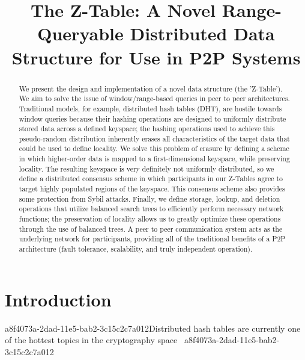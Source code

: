 \documentclass[12pt]{article}
\title{The Z-Table: A Novel Range-Queryable Distributed Data Structure for Use in P2P Systems}
\begin{document}
\maketitle

\begin{abstract}
We present the design and implementation of a novel data structure (the 'Z-Table'). We aim to solve the issue of window/range-based queries in peer to peer architectures. Traditional models, for example,  distributed hash tables (DHT), are hostile towards window queries because their hashing operations are designed to uniformly distribute stored data across a defined keyspace; the hashing operations used to achieve this pseudo-random distribution inherently erases all characteristics of the target data that could be used to define locality. We solve this problem of erasure by defining a scheme in which higher-order data is mapped to a first-dimensional keyspace, while preserving locality. The resulting keyspace is very definitely not uniformly distributed, so we define a distributed consensus scheme in which participants in our Z-Tables agree to target highly populated regions of the keyspace. This consensus scheme also provides some protection from Sybil attacks. Finally, we define storage, lookup, and deletion operations that utilize balanced search trees to efficiently perform necessary network functions; the preservation of locality allows us to greatly optimize these operations through the use of balanced trees. A peer to peer communication system acts as the underlying network for participants, providing all of the traditional benefits of a P2P architecture (fault tolerance, scalability, and truly independent operation).
\end{abstract}


\newpage
\section{Introduction}
a8f4073a-2dad-11e5-bab2-3c15c2c7a012Distributed hash tables are currently one of the hottest topics in the cryptography space~\cite{Stoica:2001dj,Rowstron:2001ea,Ratnasamy:2001wn}
a8f4073a-2dad-11e5-bab2-3c15c2c7a012
\printbibliography
\end{document}
